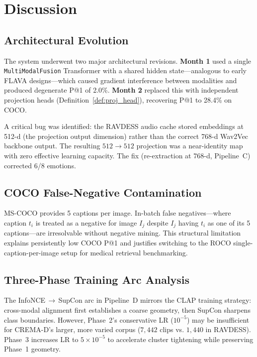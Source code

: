 \documentclass[10pt,conference]{IEEEtran}
\theoremstyle{ieeethm}
\theoremstyle{ieeedef}
\theoremstyle{ieeeremark}
\begin{document}
\section{Discussion}
\label{sec:discussion}

\subsection{Architectural Evolution}

The system underwent two major architectural revisions. \textbf{Month 1} used a single \texttt{MultiModalFusion} Transformer with a shared hidden state—analogous to early FLAVA designs—which caused gradient interference between modalities and produced degenerate P@1 of 2.0\%. \textbf{Month 2} replaced this with independent projection heads (Definition~\ref{def:proj_head}), recovering P@1 to 28.4\% on COCO.

A critical bug was identified: the RAVDESS audio cache stored embeddings at 512-d (the projection output dimension) rather than the correct 768-d Wav2Vec backbone output. The resulting $512\rightarrow512$ projection was a near-identity map with zero effective learning capacity. The fix (re-extraction at 768-d, Pipeline~C) corrected 6/8 emotions.

\subsection{COCO False-Negative Contamination}

MS-COCO provides 5 captions per image. In-batch false negatives—where caption $t_i$ is treated as a negative for image $I_j$ despite $I_j$ having $t_i$ as one of its 5 captions—are irresolvable without negative mining. This structural limitation explains persistently low COCO P@1 and justifies switching to the ROCO single-caption-per-image setup for medical retrieval benchmarking.

\subsection{Three-Phase Training Arc Analysis}

The InfoNCE\,$\to$\,SupCon arc in Pipeline~D mirrors the CLAP training strategy: cross-modal alignment first establishes a coarse geometry, then SupCon sharpens class boundaries. However, Phase~2's conservative LR ($10^{-5}$) may be insufficient for CREMA-D's larger, more varied corpus ($7,442$ clips vs. $1,440$ in RAVDESS). Phase~3 increases LR to $5{\times}10^{-5}$ to accelerate cluster tightening while preserving Phase~1 geometry.
\end{document}

